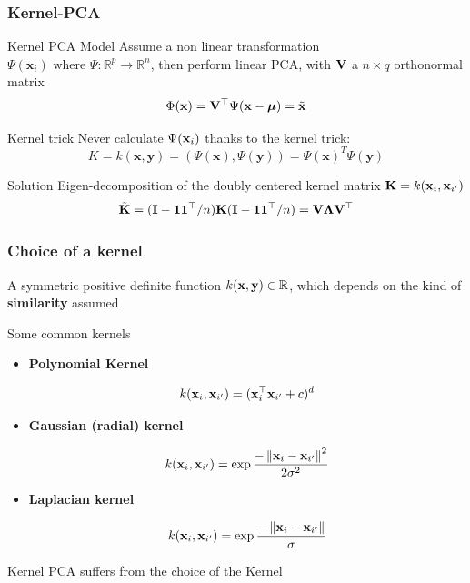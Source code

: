 \documentclass{beamer}\usepackage[]{graphicx}\usepackage[]{color}
\begin{document}
\begin{frame}
  \frametitle{Kernel-PCA}

  \begin{block}{Kernel PCA Model}
    Assume a non linear transformation $ \Psi(\mathbf{x}_i) \text{ where } \Psi : \mathbb{R}^p \to \mathbb{R}^n$,  then perform linear PCA, with $\mathbf{V}$ a \alert{\bf $n\times q$} orthonormal matrix
    \[
      \Phi(\mathbf{x}) = \mathbf{V}^\top \Psi(\mathbf{x}-\boldsymbol{\mu}) = \tilde{\mathbf{x}}
    \]
  \end{block}

  \begin{block}{Kernel trick}
    Never calculate  $\Psi(\mathbf{x}_i)$ thanks to the kernel trick:
    \[K = k(\mathbf{x},\mathbf{y}) = (\Psi(\mathbf{x}),\Psi(\mathbf{y})) = \Psi(\mathbf{x})^T\Psi(\mathbf{y}) \]
  \end{block}

  \begin{block}{Solution}
    Eigen-decomposition of the doubly centered kernel matrix $\mathbf{K} = k(\mathbf{x}_i, \mathbf{x}_{i'})$ 
    \[\tilde{\mathbf{K}} = 
    (\mathbf{I} - \mathbf{1}\mathbf{1}^\top/n) \mathbf{K} (\mathbf{I} - \mathbf{1}\mathbf{1}^\top/n) = \mathbf{V} {\boldsymbol\Lambda} \mathbf{V}^\top \]
  \end{block}

\end{frame}

\begin{frame}[fragile]
  \frametitle{Choice of a kernel} 

  A symmetric positive definite function $k(\mathbf{x},\mathbf{y}) \in \mathbb{R}$, which depends on the kind of \alert{\bf similarity} assumed

\begin{block}{Some common kernels}

\begin{itemize}
\item \alert{\bf Polynomial Kernel }

\[ k(\mathbf{x}_i,\mathbf{x}_{i'}) = (\mathbf{x}_{i}^\top \mathbf{x}_{i'} + c)^d \]

\item  \alert{\bf Gaussian (radial) kernel}

\[k(\mathbf{x}_i,\mathbf{x}_{i'}) = \exp{\frac {-\left\|\mathbf{x}_i - \mathbf{x}_{i'} \right\|^2}{2\sigma^2}}\]

\item  \alert{\bf Laplacian kernel}

\[k(\mathbf{x}_i,\mathbf{x}_{i'}) = \exp{\frac {-\left\|\mathbf{x}_i - \mathbf{x}_{i'} \right\|}{\sigma}}\]

\end{itemize}
\end{block}

\rsa Kernel PCA suffers from the choice of the Kernel

\end{frame}
\end{document}
